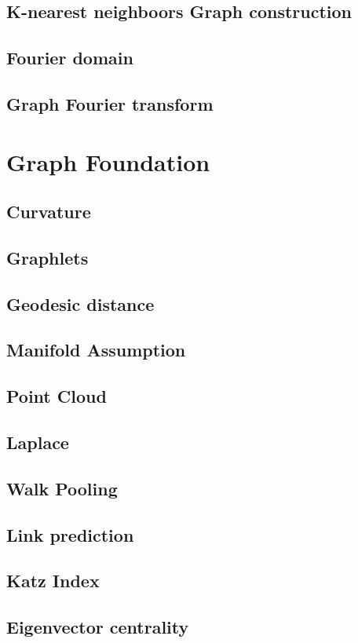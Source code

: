 \subsection{K-nearest neighboors Graph construction}
\subsection{Fourier domain}

\subsection{Graph Fourier transform}


\section{Graph Foundation}
\subsection{Curvature}
\subsection{Graphlets}
\subsection{Geodesic distance}
\subsection{Manifold Assumption}
\subsection{Point Cloud}
\subsection{Laplace}
\subsection{Walk Pooling}
\subsection{Link prediction}
\subsection{Katz Index}

\subsection{Eigenvector centrality}
